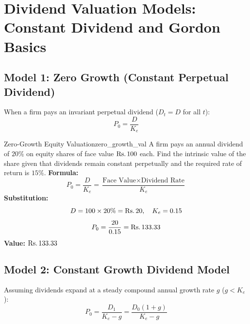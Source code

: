 \section{Dividend Valuation Models: Constant Dividend and Gordon Basics}

\subsection{Model 1: Zero Growth (Constant Perpetual Dividend)}

\begin{formulabox}
When a firm pays an invariant perpetual dividend ($D_t = D$ for all $t$):
\begin{equation}
    P_0 = \frac{D}{K_e}
\end{equation}
\end{formulabox}

\begin{example}{Zero-Growth Equity Valuation}{zero_growth_val}
A firm pays an annual dividend of $20\%$ on equity shares of face value $\text{Rs.}\, 100$ each. Find the intrinsic value of the share given that dividends remain constant perpetually and the required rate of return is $15\%$.
\tcblower
\textbf{Formula:}
\begin{equation*}
    P_0 = \frac{D}{K_e} = \frac{\text{Face Value} \times \text{Dividend Rate}}{K_e}
\end{equation*}
\textbf{Substitution:}
\begin{equation*}
    D = 100 \times 20\% = \text{Rs.}\, 20, \quad K_e = 0.15
\end{equation*}
\begin{equation*}
    P_0 = \frac{20}{0.15} = \text{Rs.}\, 133.33
\end{equation*}
\textbf{Value:} $\text{Rs.}\, 133.33$
\end{example}

\subsection{Model 2: Constant Growth Dividend Model}

\begin{formulabox}
Assuming dividends expand at a steady compound annual growth rate $g$ ($g < K_e$):
\begin{equation}
    P_0 = \frac{D_1}{K_e - g} = \frac{D_0 (1 + g)}{K_e - g}
\end{equation}
\end{formulabox}

